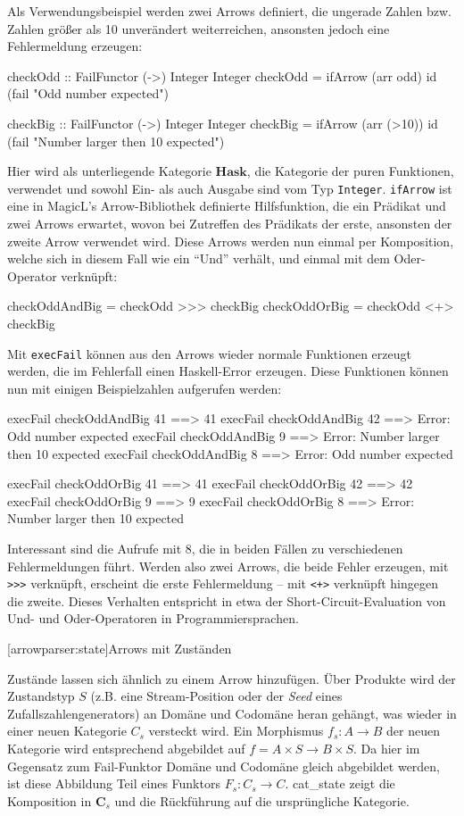 \documentclass[12pt, a4paper, bibgerm]{scrbook}
\newcommand\icode[1]{\lstinline?#1?}
\newcommand\lsection{}
\newcommand\abb{}
\newcommand\ato{\rightarrow} %
\begin{document}
Als Verwendungsbeispiel werden zwei Arrows definiert, die ungerade
Zahlen bzw. Zahlen größer als 10 unverändert weiterreichen, ansonsten
jedoch eine Fehlermeldung erzeugen:
\begin{code}
checkOdd :: FailFunctor (->) Integer Integer
checkOdd = ifArrow (arr odd) 
             id
             (fail "Odd number expected")

checkBig :: FailFunctor (->) Integer Integer
checkBig = ifArrow (arr (>10))
             id
             (fail "Number larger then 10 expected")
\end{code}
Hier wird als unterliegende Kategorie $\mathbf{Hask}$, die Kategorie der
puren Funktionen, verwendet und sowohl Ein- als auch Ausgabe sind vom
Typ \icode{Integer}. \icode{ifArrow} ist eine in MagicL's
Arrow-Bibliothek definierte Hilfsfunktion, die ein Prädikat und zwei
Arrows erwartet, wovon bei Zutreffen des Prädikats der erste, ansonsten
der zweite Arrow verwendet wird. Diese Arrows werden nun einmal per
Komposition, welche sich in diesem Fall wie ein "`Und"' verhält, und
einmal mit dem Oder-Operator verknüpft:
\begin{code}
checkOddAndBig = checkOdd >>> checkBig
checkOddOrBig  = checkOdd <+> checkBig
\end{code}
Mit \icode{execFail} können aus den Arrows wieder normale Funktionen erzeugt
werden, die im Fehlerfall einen Haskell-Error erzeugen. Diese Funktionen
können nun mit einigen Beispielzahlen aufgerufen werden: 
\begin{code}
execFail checkOddAndBig 41    ==> 41
execFail checkOddAndBig 42    ==> Error: Odd number expected  
execFail checkOddAndBig 9     ==> Error: Number larger then 10 expected  
execFail checkOddAndBig 8     ==> Error: Odd number expected

execFail checkOddOrBig 41     ==> 41
execFail checkOddOrBig 42     ==> 42
execFail checkOddOrBig 9      ==> 9
execFail checkOddOrBig 8      ==> Error: Number larger then 10 expected
\end{code}
Interessant sind die Aufrufe mit 8, die in beiden Fällen zu
verschiedenen Fehlermeldungen führt. Werden also zwei Arrows, die beide
Fehler erzeugen, mit \icode{>>>} verknüpft, erscheint die erste
Fehlermeldung -- mit \icode{<+>} verknüpft hingegen die zweite. Dieses
Verhalten entspricht in etwa der Short-Circuit-Evaluation von Und- und
Oder-Operatoren in Programmiersprachen.

\lsection[arrowparser:state]{Arrows mit Zuständen}

Zustände lassen sich ähnlich zu einem Arrow hinzufügen. Über Produkte
wird der Zustandstyp $S$ (z.B. eine Stream-Position oder der
\textit{Seed} eines Zufallszahlengenerators) an Domäne und Codomäne
heran gehängt, was wieder in einer neuen Kategorie $C_{s}$ versteckt
wird. Ein Morphismus $f_{s} : A \rightarrow B$ der neuen Kategorie
wird entsprechend abgebildet auf $f = A \times S \rightarrow B \times
S$. Da hier im Gegensatz zum Fail-Funktor Domäne und Codomäne gleich
abgebildet werden, ist diese Abbildung Teil eines Funktors $F_s: C_{s}
\ato C$. \abb{cat_state} zeigt die Komposition in $\mathbf{C}_s$ und die
Rückführung auf die ursprüngliche Kategorie.
\end{document}
